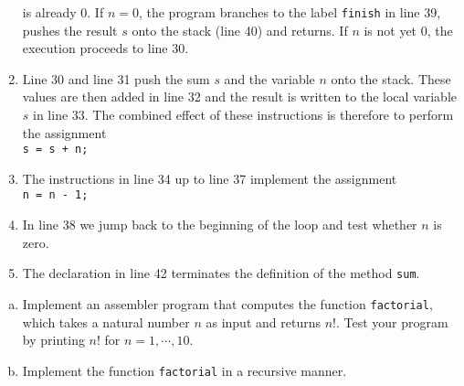 \begin{enumerate}
      is already $0$.  If $n = 0$, the program branches to the label \texttt{finish} in line 39,
      pushes the result $s$ onto the stack (line 40) and returns.  If $n$ is not yet $0$, the
      execution proceeds to line 30.
\item Line 30 and line 31 push the sum $s$ and the variable $n$ onto the stack.  These
      values are then added in line 32 and the result is written to the local variable $s$ in line 33.
      The combined effect of these instructions is therefore to perform the assignment
      \\[0.2cm]
      \hspace*{1.3cm}
      \texttt{s = s + n;}
\item The instructions in line 34 up to line 37 implement the assignment 
      \\[0.2cm]
      \hspace*{1.3cm}
      \texttt{n = n - 1;}
\item In line 38 we jump back to the beginning of the loop and test whether $n$ is zero.  
\item The declaration in line 42 terminates the definition of the method \texttt{sum}.
\end{enumerate}

\exerciseEng
\begin{enumerate}[(a)]
\item Implement an assembler program that computes the function \texttt{factorial}, which takes a natural
      number $n$ as input and returns $n!$.  Test your program by printing
      $n!$ for $n = 1, \cdots, 10$.
\item Implement the function \texttt{factorial} in a recursive manner.
\end{enumerate}


